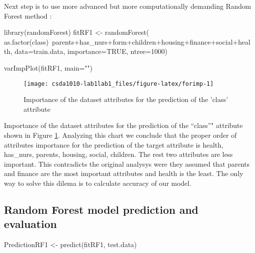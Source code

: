 Next step is to use more advanced but more computationally demanding
Random Forest method \citep{R-randomForest}:

\begin{Schunk}
\begin{Sinput}
library(randomForest)
fitRF1 <- randomForest(
  as.factor(class)~parents+has_nurs+form+children+housing+finance+social+health,
  data=train.data, importance=TRUE, ntree=1000)
\end{Sinput}
\end{Schunk}

\begin{Schunk}
\begin{Sinput}
varImpPlot(fitRF1, main="")
\end{Sinput}
\begin{figure}[h]

{\centering \texttt{[image: csda1010-lab1lab1\_files/figure-latex/forimp-1]} 

}

\caption[Importance of the dataset attributes for the prediction of the 'class' attribute]{Importance of the dataset attributes for the prediction of the 'class' attribute}\label{fig:forimp}
\end{figure}
\end{Schunk}

Importance of the dataset attributes for the prediction of the
``class''" attribute shown in Figure \ref{fig:forimp}. Analyzing this
chart we conclude that the proper order of attributes importance for the
prediction of the target attribute is health, has\_nurs, parents,
housing, social, children. The rest two attributes are less important.
This contradicts the original analysys \citep{noauthor_uci_nodate} were
they assumed that parents and finance are the most important attributes
and health is the least. The only way to solve this dilema is to
calculate accuracy of our model.

\newpage

\hypertarget{random-forest-model-prediction-and-evaluation}{%
\subsection{Random Forest model prediction and
evaluation}\label{random-forest-model-prediction-and-evaluation}}

\begin{Schunk}
\begin{Sinput}
PredictionRF1 <- predict(fitRF1, test.data)
\end{Sinput}
\end{Schunk}

